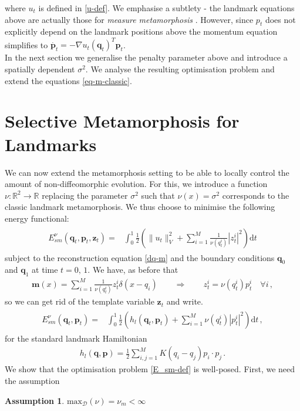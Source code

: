 \documentclass[runningheads]{llncs}
\newcommand{\half}{\frac 12}
\newcommand{\norm}[2]{\| #1 \|_{ #2 }}
\newcommand{\vnorm}[1]{\norm{ #1 }{V}}
\newcommand{\diff}[1]{\text{d} #1}
\newcommand{\nuinf}{\nu_\text{inf}}
\newtheorem{assumption}{Assumption}
\begin{document}
where $u_t$ is defined in \eqref{u-def}. We emphasise a subtlety - the landmark
equations above are actually those for \emph{measure metamorphosis}
\cite[Section 11.1, equation 33]{holm2009euler}. However, since $p_t$ does not
explicitly depend on the landmark positions above the momentum equation
simplifies to $\dot{\mathbf p_t} = - \nabla u_t(\mathbf q_t)^T \mathbf p_t$.\\

In the next section we generalise the penalty parameter above and introduce a
spatially dependent $\sigma^2$. We analyse the resulting optimisation problem
and extend the equations \eqref{eq-m-classic}.

\section{Selective Metamorphosis for Landmarks}\label{sec:select_mm}

We can now extend the metamorphosis setting to be able to locally control the
amount of non-diffeomorphic evolution.  For this, we introduce a function $\nu:
\mathbb R^2\to \mathbb R$ replacing the parameter $\sigma^2$ such that
$\nu(x)=\sigma^2$ corresponds to the classic landmark metamorphosis.
We thus choose to minimise the following energy functional:
\begin{align}
  \begin{split}
    E_{sm}^\nu(\mathbf q_t, \mathbf p_t, \mathbf z_t) = & \int_0^1
    \half  \left (\vnorm{u_t}^2 +\sum_{i=1}^M \frac{1}{\nu(q_t^i)}|z_t^i|^2\right )\diff{t}
  \end{split}
  \label{E_sm-def}
\end{align}
subject to the reconstruction equation \eqref{dq-m} and the boundary conditions
$\mathbf q_0$ and $\mathbf q_1$ at time $t=0,\,1$. We have, as before that
\begin{align}\label{zp_relation}
  \mathbf m(x) = \sum_{i=1}^M \frac{1}{\nu(q_t^i)} z_t^i\delta(x-q_i)\qquad \Rightarrow \qquad
  z_t^i = \nu(q_t^i) p_t^i\quad \forall i\, , 
\end{align}
so we can get rid of the template variable $\mathbf z_t$ and write. 
\begin{align}
  \begin{split}
    E_{sm}^\nu(\mathbf q_t, \mathbf p_t) = & \int_0^1
    \half  \left (h_l(\mathbf q_t,\mathbf p_t)  +\sum_{i=1}^M \nu(q_t^i)|p_t^i|^2\right )\diff{t}\, , 
  \end{split}
  \label{E_sm-def_p}
\end{align}
for the standard landmark Hamiltonian
\begin{align}
  h_l(\mathbf q, \mathbf p) =  \frac12 \sum_{i,j=1}^M K(q_i-q_j)p_i\cdot p_j\, . 
\label{hamiltonian}
\end{align}
We show that the optimisation problem \eqref{E_sm-def} is well-posed. First, we
need the assumption
\begin{assumption}\label{assumption:nu_bounded}
  $\mathrm{max}_\mathcal{D}(\nu) = \nu_m < \infty$ %
\end{assumption}
\end{document}
